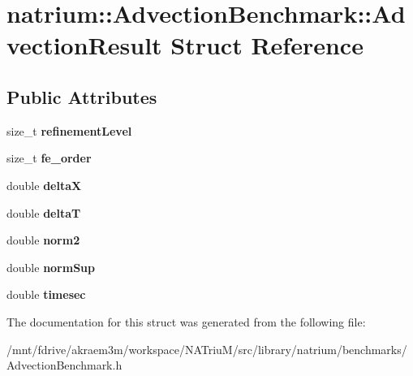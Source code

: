 \hypertarget{structnatrium_1_1AdvectionBenchmark_1_1AdvectionResult}{
\section{natrium::AdvectionBenchmark::AdvectionResult Struct Reference}
\label{structnatrium_1_1AdvectionBenchmark_1_1AdvectionResult}
}
\subsection*{Public Attributes}
\begin{DoxyCompactItemize}
\item 
\hypertarget{structnatrium_1_1AdvectionBenchmark_1_1AdvectionResult_ab60c8fdb45a25d1711492f7ff0d5cb24}{
size\_\-t {\bfseries refinementLevel}}
\label{structnatrium_1_1AdvectionBenchmark_1_1AdvectionResult_ab60c8fdb45a25d1711492f7ff0d5cb24}

\item 
\hypertarget{structnatrium_1_1AdvectionBenchmark_1_1AdvectionResult_a0ece16b6c589f53b6ada67e618b914ef}{
size\_\-t {\bfseries fe\_\-order}}
\label{structnatrium_1_1AdvectionBenchmark_1_1AdvectionResult_a0ece16b6c589f53b6ada67e618b914ef}

\item 
\hypertarget{structnatrium_1_1AdvectionBenchmark_1_1AdvectionResult_ae7a2db7be731a116c896d9b31822c504}{
double {\bfseries deltaX}}
\label{structnatrium_1_1AdvectionBenchmark_1_1AdvectionResult_ae7a2db7be731a116c896d9b31822c504}

\item 
\hypertarget{structnatrium_1_1AdvectionBenchmark_1_1AdvectionResult_af7b2e2218885c77be1d35fd67fe0e8d3}{
double {\bfseries deltaT}}
\label{structnatrium_1_1AdvectionBenchmark_1_1AdvectionResult_af7b2e2218885c77be1d35fd67fe0e8d3}

\item 
\hypertarget{structnatrium_1_1AdvectionBenchmark_1_1AdvectionResult_ace3aa8bafc7e3b8f8df4b57fe7f7bbab}{
double {\bfseries norm2}}
\label{structnatrium_1_1AdvectionBenchmark_1_1AdvectionResult_ace3aa8bafc7e3b8f8df4b57fe7f7bbab}

\item 
\hypertarget{structnatrium_1_1AdvectionBenchmark_1_1AdvectionResult_adf5022d425014f41257b51963b76fa5a}{
double {\bfseries normSup}}
\label{structnatrium_1_1AdvectionBenchmark_1_1AdvectionResult_adf5022d425014f41257b51963b76fa5a}

\item 
\hypertarget{structnatrium_1_1AdvectionBenchmark_1_1AdvectionResult_ab3b276d8c638f23e685af5c99aa42370}{
double {\bfseries timesec}}
\label{structnatrium_1_1AdvectionBenchmark_1_1AdvectionResult_ab3b276d8c638f23e685af5c99aa42370}

\end{DoxyCompactItemize}


The documentation for this struct was generated from the following file:\begin{DoxyCompactItemize}
\item 
/mnt/fdrive/akraem3m/workspace/NATriuM/src/library/natrium/benchmarks/AdvectionBenchmark.h\end{DoxyCompactItemize}
